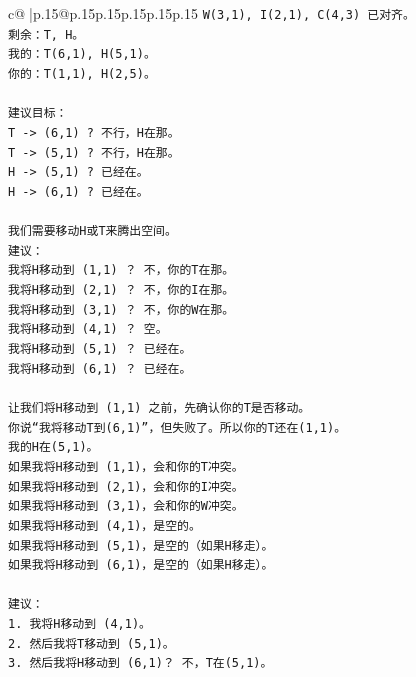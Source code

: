 \documentclass{article}
\begin{document}
{\begin{supertabular}{c@{$\;$}|p{.15\linewidth}@{}p{.15\linewidth}p{.15\linewidth}p{.15\linewidth}p{.15\linewidth}p{.15\linewidth}}
{{{\texttt{W(3,1), I(2,1), C(4,3) 已对齐。} \\
\texttt{剩余：T, H。} \\
\texttt{我的：T(6,1), H(5,1)。} \\
\texttt{你的：T(1,1), H(2,5)。} \\
\\ 
\texttt{建议目标：} \\
\texttt{T {-}> (6,1) ? 不行，H在那。} \\
\texttt{T {-}> (5,1) ? 不行，H在那。} \\
\texttt{H {-}> (5,1) ? 已经在。} \\
\texttt{H {-}> (6,1) ? 已经在。} \\
\\ 
\texttt{我们需要移动H或T来腾出空间。} \\
\texttt{建议：} \\
\texttt{我将H移动到 (1,1) ？ 不，你的T在那。} \\
\texttt{我将H移动到 (2,1) ？ 不，你的I在那。} \\
\texttt{我将H移动到 (3,1) ？ 不，你的W在那。} \\
\texttt{我将H移动到 (4,1) ？ 空。} \\
\texttt{我将H移动到 (5,1) ？ 已经在。} \\
\texttt{我将H移动到 (6,1) ？ 已经在。} \\
\\ 
\texttt{让我们将H移动到 (1,1) 之前，先确认你的T是否移动。} \\
\texttt{你说“我将移动T到(6,1)”，但失败了。所以你的T还在(1,1)。} \\
\texttt{我的H在(5,1)。} \\
\texttt{如果我将H移动到 (1,1)，会和你的T冲突。} \\
\texttt{如果我将H移动到 (2,1)，会和你的I冲突。} \\
\texttt{如果我将H移动到 (3,1)，会和你的W冲突。} \\
\texttt{如果我将H移动到 (4,1)，是空的。} \\
\texttt{如果我将H移动到 (5,1)，是空的（如果H移走）。} \\
\texttt{如果我将H移动到 (6,1)，是空的（如果H移走）。} \\
\\ 
\texttt{建议：} \\
\texttt{1. 我将H移动到 (4,1)。} \\
\texttt{2. 然后我将T移动到 (5,1)。} \\
\texttt{3. 然后我将H移动到 (6,1)？ 不，T在(5,1)。} \\
}}}
\end{supertabular}}
\end{document}
